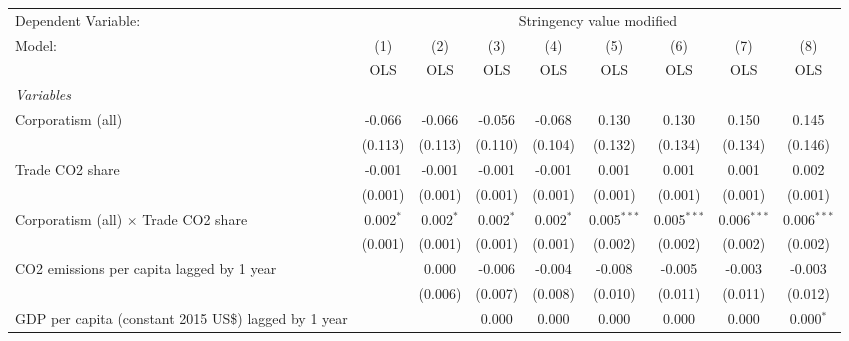 
\begingroup
\centering
\begin{tabular}{lcccccccc}
   \toprule
   Dependent Variable: & \multicolumn{8}{c}{Stringency value modified}\\
   Model:                                                     & (1)         & (2)         & (3)         & (4)         & (5)           & (6)           & (7)           & (8)\\  
                                                              &  OLS        & OLS         & OLS         & OLS         & OLS           & OLS           & OLS           & OLS\\  
   \midrule
   \emph{Variables}\\
   Corporatism (all)                                          & -0.066      & -0.066      & -0.056      & -0.068      & 0.130         & 0.130         & 0.150         & 0.145\\   
                                                              & (0.113)     & (0.113)     & (0.110)     & (0.104)     & (0.132)       & (0.134)       & (0.134)       & (0.146)\\   
   Trade CO2 share                                            & -0.001      & -0.001      & -0.001      & -0.001      & 0.001         & 0.001         & 0.001         & 0.002\\   
                                                              & (0.001)     & (0.001)     & (0.001)     & (0.001)     & (0.001)       & (0.001)       & (0.001)       & (0.001)\\   
   Corporatism (all) $\times$ Trade CO2 share                 & 0.002$^{*}$ & 0.002$^{*}$ & 0.002$^{*}$ & 0.002$^{*}$ & 0.005$^{***}$ & 0.005$^{***}$ & 0.006$^{***}$ & 0.006$^{***}$\\   
                                                              & (0.001)     & (0.001)     & (0.001)     & (0.001)     & (0.002)       & (0.002)       & (0.002)       & (0.002)\\   
   CO2 emissions per capita lagged by 1 year                  &             & 0.000       & -0.006      & -0.004      & -0.008        & -0.005        & -0.003        & -0.003\\   
                                                              &             & (0.006)     & (0.007)     & (0.008)     & (0.010)       & (0.011)       & (0.011)       & (0.012)\\   
   GDP per capita (constant 2015 US\$) lagged by 1 year       &             &             & 0.000       & 0.000       & 0.000         & 0.000         & 0.000         & 0.000$^{*}$\\   

\end{tabular}
